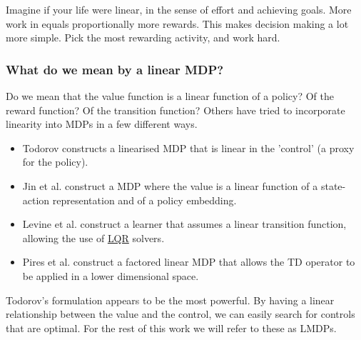 
Imagine if your life were linear, in the sense of effort and achieving goals.
More work in equals proportionally more rewards. This makes decision making
a lot more simple. Pick the most rewarding activity, and work hard.

\subsubsection{What do we mean by a linear MDP?}

Do we mean that the value function is a linear function of a policy?
Of the reward function? Of the transition function? Others have tried to incorporate
linearity into MDPs in a few different ways.

\begin{itemize}
  \tightlist
  \item Todorov constructs a linearised MDP that is linear in the 'control' (a proxy for the policy)\cite{Todorov2006}.
  \item Jin et al. construct a MDP where the value is a linear function of a state-action representation and of a policy embedding\cite{Wang}.
  \item Levine et al. construct a learner that assumes a linear transition function, allowing the use of \href{https://en.wikipedia.org/wiki/Linear%E2%80%93quadratic_regulator}{LQR} solvers\cite{Levine2019}.
  \item Pires et al. construct a factored linear MDP that allows the TD operator to be applied in a lower dimensional space\cite{Pires2016}.
\end{itemize}

Todorov's formulation appears to be the most powerful. By having a linear
relationship between the value and the control, we can easily search for controls that
are optimal. For the rest of this work we will refer to these as LMDPs.


